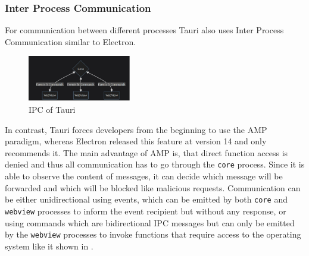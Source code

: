 \subsubsection{Inter Process Communication}
For communication between different processes Tauri also uses Inter Process Communication similar to Electron.
\begin{figure}[ht]
    \centering
    \includegraphics[width=0.4\textwidth]{images/TauriArchitecture}
    \caption{IPC of Tauri~\cite[Figure 1-3]{tauri}}
    \label{fig:tauri:ipc}
\end{figure}
In contrast, Tauri forces developers from the beginning to use the \ac{AMP} paradigm, whereas Electron released this feature at version 14 and only recommends it.
The main advantage of \ac{AMP} is, that direct function access is denied and thus all communication has to go through the \texttt{core} process.
Since it is able to observe the content of messages, it can decide which message will be forwarded and which will be blocked like malicious requests.
Communication can be either unidirectional using events, which can be emitted by both \texttt{core} and \texttt{webview} processes to inform the event recipient but without any response,
or using commands which are bidirectional \ac{IPC} messages but can only be emitted by the \texttt{webview} processes to invoke functions that require access to the operating system like it shown in .

